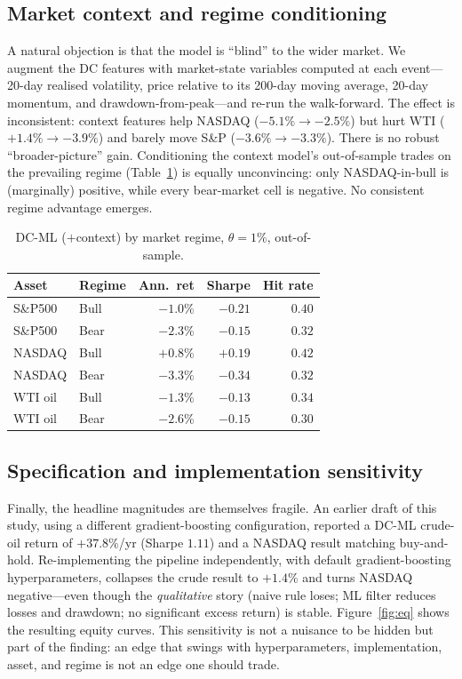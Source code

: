 \documentclass[11pt]{article}
\begin{document}
\subsection{Market context and regime conditioning}
A natural objection is that the model is ``blind'' to the wider market. We
augment the DC features with market-state variables computed at each event---
20-day realised volatility, price relative to its 200-day moving average, 20-day
momentum, and drawdown-from-peak---and re-run the walk-forward. The effect is
inconsistent: context features help NASDAQ ($-5.1\%\to-2.5\%$) but hurt WTI
($+1.4\%\to-3.9\%$) and barely move S\&P ($-3.6\%\to-3.3\%$). There is no robust
``broader-picture'' gain. Conditioning the context model's out-of-sample trades
on the prevailing regime (Table~\ref{tab:regime}) is equally unconvincing: only
NASDAQ-in-bull is (marginally) positive, while every bear-market cell is
negative. No consistent regime advantage emerges.

\begin{table}[t]\centering
\caption{DC-ML ($+$context) by market regime, $\theta=1\%$, out-of-sample.}
\label{tab:regime}
\begin{tabular}{llrrr}
\toprule
Asset & Regime & Ann.\ ret & Sharpe & Hit rate \\
\midrule
S\&P500 & Bull & $-1.0\%$ & $-0.21$ & $0.40$ \\
S\&P500 & Bear & $-2.3\%$ & $-0.15$ & $0.32$ \\
NASDAQ  & Bull & $+0.8\%$ & $+0.19$ & $0.42$ \\
NASDAQ  & Bear & $-3.3\%$ & $-0.34$ & $0.32$ \\
WTI oil & Bull & $-1.3\%$ & $-0.13$ & $0.34$ \\
WTI oil & Bear & $-2.6\%$ & $-0.15$ & $0.30$ \\
\bottomrule
\end{tabular}
\end{table}

\subsection{Specification and implementation sensitivity}
Finally, the headline magnitudes are themselves fragile. An earlier draft of
this study, using a different gradient-boosting configuration, reported a DC-ML
crude-oil return of $+37.8\%$/yr (Sharpe $1.11$) and a NASDAQ result matching
buy-and-hold. Re-implementing the pipeline independently, with default
gradient-boosting hyperparameters, collapses the crude result to $+1.4\%$ and
turns NASDAQ negative---even though the \emph{qualitative} story (naive rule
loses; ML filter reduces losses and drawdown; no significant excess return) is
stable. Figure~\ref{fig:eq} shows the resulting equity curves. This sensitivity
is not a nuisance to be hidden but part of the finding: an edge that swings with
hyperparameters, implementation, asset, and regime is not an edge one should
trade.
\end{document}

